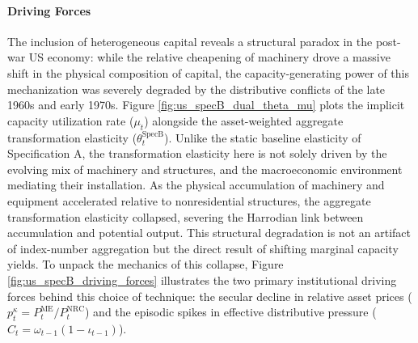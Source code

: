 \paragraph{Driving Forces} The inclusion of heterogeneous capital reveals a structural paradox in the post-war US economy: while the relative cheapening of machinery drove a massive shift in the physical composition of capital, the capacity-generating power of this mechanization was severely degraded by the distributive conflicts of the late 1960s and early 1970s. Figure \ref{fig:us_specB_dual_theta_mu} plots the implicit capacity utilization rate ($\mu_t$) alongside the asset-weighted aggregate transformation elasticity ($\theta_t^{\text{SpecB}}$). Unlike the static baseline elasticity of Specification A, the transformation elasticity here is not solely driven by the evolving mix of machinery and structures, and the macroeconomic environment mediating their installation. As the physical accumulation of machinery and equipment accelerated relative to nonresidential structures, the aggregate transformation elasticity collapsed, severing the Harrodian link between accumulation and potential output. This structural degradation is not an artifact of index-number aggregation but the direct result of shifting marginal capacity yields. To unpack the mechanics of this collapse, Figure \ref{fig:us_specB_driving_forces} illustrates the two primary institutional driving forces behind this choice of technique: the secular decline in relative asset prices ($p_t^{\kappa} = P_t^{\text{ME}}/P_t^{\text{NRC}}$) and the episodic spikes in effective distributive pressure ($C_t = \omega_{t-1}(1-\iota_{t-1})$).

